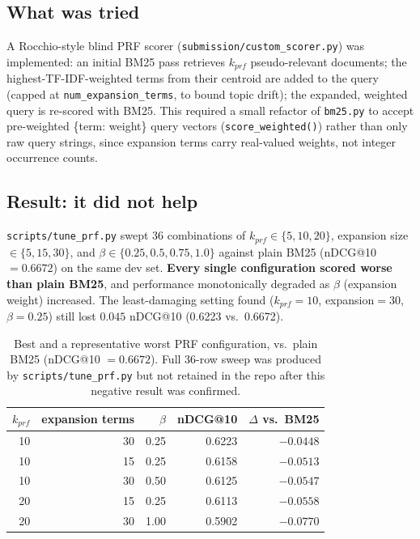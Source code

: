 \documentclass[11pt]{article}
\begin{document}
\subsection{What was tried}
A Rocchio-style blind PRF scorer (\texttt{submission/custom\_scorer.py})
was implemented: an initial BM25 pass retrieves $k_{prf}$ pseudo-relevant
documents; the highest-TF-IDF-weighted terms from their centroid are
added to the query (capped at \texttt{num\_expansion\_terms}, to bound
topic drift); the expanded, weighted query is re-scored with BM25. This
required a small refactor of \texttt{bm25.py} to accept pre-weighted
\{term: weight\} query vectors (\texttt{score\_weighted()}) rather than
only raw query strings, since expansion terms carry real-valued weights,
not integer occurrence counts.

\subsection{Result: it did not help}
\texttt{scripts/tune\_prf.py} swept 36 combinations of $k_{prf} \in
\{5,10,20\}$, expansion size $\in \{5,15,30\}$, and $\beta \in
\{0.25,0.5,0.75,1.0\}$ against plain BM25 (nDCG@10 $=0.6672$) on the same
dev set. \textbf{Every single configuration scored worse than plain
BM25}, and performance monotonically degraded as $\beta$ (expansion
weight) increased. The least-damaging setting found
($k_{prf}{=}10$, expansion${=}30$, $\beta{=}0.25$) still lost $0.045$
nDCG@10 (0.6223 vs.\ 0.6672).

\begin{table}[h]
\centering
\begin{tabular}{rrrrr}
\toprule
$k_{prf}$ & expansion terms & $\beta$ & nDCG@10 & $\Delta$ vs.\ BM25 \\
\midrule
10 & 30 & 0.25 & 0.6223 & $-0.0448$ \\
10 & 15 & 0.25 & 0.6158 & $-0.0513$ \\
10 & 30 & 0.50 & 0.6125 & $-0.0547$ \\
20 & 15 & 0.25 & 0.6113 & $-0.0558$ \\
20 & 30 & 1.00 & 0.5902 & $-0.0770$ \\
\bottomrule
\end{tabular}
\caption{Best and a representative worst PRF configuration, vs.\ plain
BM25 (nDCG@10 $=0.6672$). Full 36-row sweep was produced by
\texttt{scripts/tune\_prf.py} but not retained in the repo after this
negative result was confirmed.}
\end{table}
\end{document}
